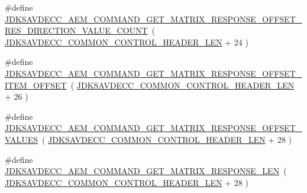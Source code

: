\begin{DoxyCompactItemize}
\item 
\#define \hyperlink{group__command__get__matrix__response_gabcc8825e2c5af056c2e6c4fc517a9be3}{J\+D\+K\+S\+A\+V\+D\+E\+C\+C\+\_\+\+A\+E\+M\+\_\+\+C\+O\+M\+M\+A\+N\+D\+\_\+\+G\+E\+T\+\_\+\+M\+A\+T\+R\+I\+X\+\_\+\+R\+E\+S\+P\+O\+N\+S\+E\+\_\+\+O\+F\+F\+S\+E\+T\+\_\+\+R\+E\+S\+\_\+\+D\+I\+R\+E\+C\+T\+I\+O\+N\+\_\+\+V\+A\+L\+U\+E\+\_\+\+C\+O\+U\+NT}~( \hyperlink{group__jdksavdecc__avtp__common__control__header_gaae84052886fb1bb42f3bc5f85b741dff}{J\+D\+K\+S\+A\+V\+D\+E\+C\+C\+\_\+\+C\+O\+M\+M\+O\+N\+\_\+\+C\+O\+N\+T\+R\+O\+L\+\_\+\+H\+E\+A\+D\+E\+R\+\_\+\+L\+EN} + 24 )
\item 
\#define \hyperlink{group__command__get__matrix__response_ga0886150f5c2891a21829b01779416f25}{J\+D\+K\+S\+A\+V\+D\+E\+C\+C\+\_\+\+A\+E\+M\+\_\+\+C\+O\+M\+M\+A\+N\+D\+\_\+\+G\+E\+T\+\_\+\+M\+A\+T\+R\+I\+X\+\_\+\+R\+E\+S\+P\+O\+N\+S\+E\+\_\+\+O\+F\+F\+S\+E\+T\+\_\+\+I\+T\+E\+M\+\_\+\+O\+F\+F\+S\+ET}~( \hyperlink{group__jdksavdecc__avtp__common__control__header_gaae84052886fb1bb42f3bc5f85b741dff}{J\+D\+K\+S\+A\+V\+D\+E\+C\+C\+\_\+\+C\+O\+M\+M\+O\+N\+\_\+\+C\+O\+N\+T\+R\+O\+L\+\_\+\+H\+E\+A\+D\+E\+R\+\_\+\+L\+EN} + 26 )
\item 
\#define \hyperlink{group__command__get__matrix__response_gae79279ac5e69d3e21adc56f083709816}{J\+D\+K\+S\+A\+V\+D\+E\+C\+C\+\_\+\+A\+E\+M\+\_\+\+C\+O\+M\+M\+A\+N\+D\+\_\+\+G\+E\+T\+\_\+\+M\+A\+T\+R\+I\+X\+\_\+\+R\+E\+S\+P\+O\+N\+S\+E\+\_\+\+O\+F\+F\+S\+E\+T\+\_\+\+V\+A\+L\+U\+ES}~( \hyperlink{group__jdksavdecc__avtp__common__control__header_gaae84052886fb1bb42f3bc5f85b741dff}{J\+D\+K\+S\+A\+V\+D\+E\+C\+C\+\_\+\+C\+O\+M\+M\+O\+N\+\_\+\+C\+O\+N\+T\+R\+O\+L\+\_\+\+H\+E\+A\+D\+E\+R\+\_\+\+L\+EN} + 28 )
\item 
\#define \hyperlink{group__command__get__matrix__response_ga1e5cff1febbf3cdec919f94c81e3161d}{J\+D\+K\+S\+A\+V\+D\+E\+C\+C\+\_\+\+A\+E\+M\+\_\+\+C\+O\+M\+M\+A\+N\+D\+\_\+\+G\+E\+T\+\_\+\+M\+A\+T\+R\+I\+X\+\_\+\+R\+E\+S\+P\+O\+N\+S\+E\+\_\+\+L\+EN}~( \hyperlink{group__jdksavdecc__avtp__common__control__header_gaae84052886fb1bb42f3bc5f85b741dff}{J\+D\+K\+S\+A\+V\+D\+E\+C\+C\+\_\+\+C\+O\+M\+M\+O\+N\+\_\+\+C\+O\+N\+T\+R\+O\+L\+\_\+\+H\+E\+A\+D\+E\+R\+\_\+\+L\+EN} + 28 )
\end{DoxyCompactItemize}
